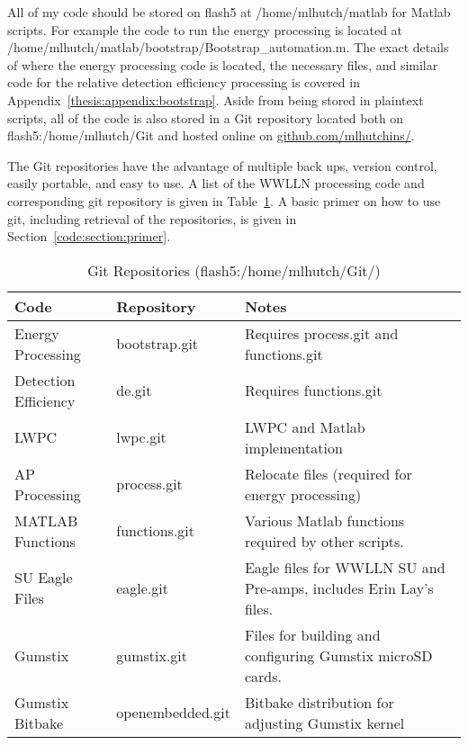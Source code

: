 All of my code should be stored on flash5 at /home/mlhutch/matlab for Matlab scripts.
For example the code to run the energy processing is located at /home/mlhutch/matlab/bootstrap/Bootstrap\_automation.m.
The exact details of where the energy processing code is located, the necessary files, and similar code for the relative detection efficiency processing is covered in Appendix~\ref{thesis:appendix:bootstrap}.
Aside from being stored in plaintext scripts, all of the code is also stored in a Git repository located both on flash5:/home/mlhutch/Git and hosted online on \href{http://github.com/mlhutchins}{github.com/mlhutchins/}.

The Git repositories have the advantage of multiple back ups, version control, easily portable, and easy to use.
A list of the WWLLN processing code and corresponding git repository is given in Table~\ref{code:table:repo}.
A basic primer on how to use git, including retrieval of the repositories, is given in Section~\ref{code:section:primer}.

\begin{table}[h!]
\caption{Git Repositories (flash5:/home/mlhutch/Git/)}
\begin{center}
\begin{tabular}{|p{1.5in}|p{1.25in}|p{3in}|}

\hline
{\bf Code} &	{\bf Repository} &	{\bf Notes}\\

\hline
\rule{0pt}{3ex}
Energy Processing	&bootstrap.git	&	Requires process.git and functions.git \\ 

\hline
\rule{0pt}{3ex}
Detection Efficiency	&de.git	&	Requires functions.git\\ 

\hline
\rule{0pt}{3ex}
LWPC	&lwpc.git	&	LWPC and Matlab implementation\\ 

\hline
\rule{0pt}{3ex}
AP Processing	&process.git	&	Relocate files (required for energy processing)\\ 

\hline
\rule{0pt}{3ex}
MATLAB Functions	&functions.git	&	Various Matlab functions required by other scripts.\\ 

\hline
\rule{0pt}{3ex}
SU Eagle Files	&eagle.git	&	Eagle files for WWLLN SU and Pre-amps, includes Erin Lay's files.\\ 

\hline
\rule{0pt}{3ex}
Gumstix	&gumstix.git	&	Files for building and configuring Gumstix microSD cards.\\ 

\hline
\rule{0pt}{3ex}
Gumstix Bitbake	&openembedded.git	&	Bitbake distribution for adjusting Gumstix kernel\\ 

\hline
\end{tabular}
\end{center}
\label{code:table:repo}
\end{table}

